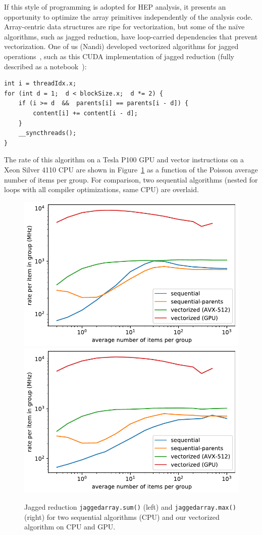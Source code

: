 \documentclass{webofc}
\begin{document}
If this style of programming is adopted for HEP analysis, it presents an opportunity to optimize the array primitives independently of the analysis code. Array-centric data structures are ripe for vectorization, but some of the na\"ive algorithms, such as jagged reduction, have loop-carried dependencies that prevent vectorization. One of us (Nandi) developed vectorized algorithms for jagged operations~\cite{jaydeep}, such as this CUDA implementation of jagged reduction (fully described as a notebook~\cite{performance2}):
\begin{center}
\begin{minipage}{0.7\linewidth}
{\small\begin{verbatim}
int i = threadIdx.x;
for (int d = 1;  d < blockSize.x;  d *= 2) {
    if (i >= d  &&  parents[i] == parents[i - d]) {
        content[i] += content[i - d];
    }
    __syncthreads();
}
\end{verbatim}
}
\end{minipage}
\end{center}
\noindent The rate of this algorithm on a Tesla P100 GPU and vector instructions on a Xeon Silver 4110 CPU are shown in Figure~\ref{rates_logy} as a function of the Poisson average number of items per group. For comparison, two sequential algorithms (nested for loops with all compiler optimizations, same CPU) are overlaid.

\begin{figure}[bh]
\includegraphics[width=0.48\linewidth]{sum_rates_logy.pdf}\hfill \includegraphics[width=0.48\linewidth]{max_rates_logy.pdf}

\caption{Jagged reduction \texttt{jaggedarray.sum()} (left) and \texttt{jaggedarray.max()} (right) for two sequential algorithms (CPU) and our vectorized algorithm on CPU and GPU. \label{rates_logy}}
\vspace{-0.5 cm}
\end{figure}
\end{document}
